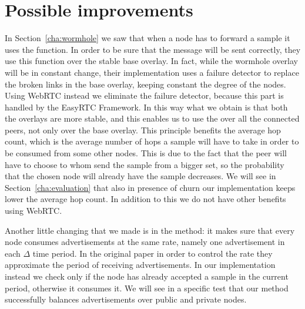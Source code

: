 \section{Possible improvements}
\label{sec:improvements}
In Section~\ref{cha:wormhole} we saw that when a node has to forward a sample it uses the \getMetropolisHastingsNeighbour function. In order to be sure that the message will be sent correctly, they use this function over the stable base overlay. In fact, while the wormhole overlay will be in constant change, their implementation uses a failure detector to replace the broken links in the base overlay, keeping constant the degree of the nodes. Using WebRTC instead we eliminate the failure detector, because this part is handled by the EasyRTC Framework. In this way what we obtain is that both the overlays are more stable, and this enables us to use the \getMetropolisHastingsNeighbour over all the connected peers, not only over the base overlay. This principle benefits the average hop count, which is the average number of hops a sample will have to take in order to be consumed from some other nodes. This is due to the fact that the peer will have to choose to whom send the sample from a bigger set, so the probability that the chosen node will already have the sample decreases. We will see in Section~\ref{cha:evaluation} that also in presence of churn our implementation keeps lower the average hop count. In addition to this we do not have other benefits using WebRTC. 

Another little changing that we made is in the \acceptAd method: it makes sure that every node consumes advertisements at the same rate, namely one advertisement in each $\Delta$ time period. In the original paper in order to control the rate they approximate the period of receiving advertisements. In our implementation instead we check only if the node has already accepted a sample in the current period, otherwise it consumes it. We will see in a specific test that our \acceptAd method successfully balances advertisements over public and private nodes.

